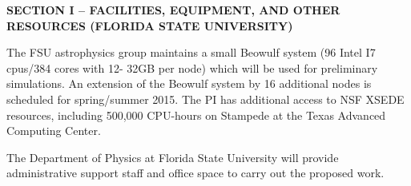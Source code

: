 \documentclass[11pt]{article}
\begin{document}
\vspace{-6mm}
\begin{center} 
\bfseries\uppercase{Section I -- Facilities, Equipment, and Other
  Resources (Florida State University)}
\end{center}

The FSU astrophysics group maintains a small Beowulf system (96 Intel I7 cpus/384 cores with 12-
32GB per node) which will be used for preliminary simulations. An extension of the Beowulf system by
16 additional nodes is scheduled for spring/summer 2015.  
The PI has additional access to NSF XSEDE resources, including 500,000 CPU-hours
on Stampede at the Texas Advanced Computing Center.  

The Department of Physics at Florida State University will provide
administrative support staff and  office space to carry out the proposed work.
\end{document}
